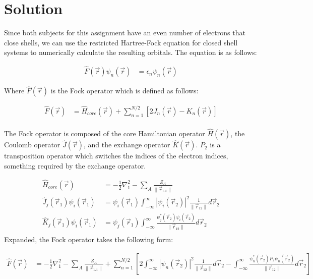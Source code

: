 \documentclass[10pt, oneside, letterpaper]{article}
\begin{document}
\section{Solution}

Since both subjects for this assignment have an even number of electrons that close shells, we can use the restricted Hartree-Fock equation for closed shell systems to numerically calculate the resulting orbitals. The equation is as follows:

\begin{align*}
  \hat{F}(\vec{r})\psi_n(\vec{r}) &= \epsilon_n\psi_n(\vec{r})
\end{align*}

Where $\hat{F}(\vec{r})$ is the Fock operator which is defined as follows:

\begin{align*}
  \hat{F}(\vec{r}) &= \hat{H}_{core}(\vec{r}) + \sum_{n=1}^{N/2}\left[2J_n(\vec{r}) - K_n(\vec{r})\right]\\
\end{align*}

The Fock operator is composed of the core Hamiltonian operator $\hat{H}(\vec{r})$, the Coulomb operator $\hat{J}(\vec{r})$, and the exchange operator $\hat{K}(\vec{r})$. $P_2$ is a transposition operator which switches the indices of the electron indices, something required by the exchange operator.

\begin{align*}
  \hat{H}_{core}(\vec{r}) &= -\frac{1}{2}\nabla_1^2 - \sum_A\frac{Z_A}{\|\vec{r}_{1 A}\|}\\
  \hat{J}_j(\vec{r}_1)\psi_i(\vec{r}_1) &= \psi_i(\vec{r}_1)\int_{-\infty}^{\infty}\left|\psi_i(\vec{r}_2)\right|^2\frac{1}{\|\vec{r}_{12}\|}d\vec{r}_2 \\
  \hat{K}_j(\vec{r}_1)\psi_i(\vec{r}_1) &= \psi_j(\vec{r}_1)\int_{-\infty}^{\infty}\frac{\psi_j^\ast(\vec{r}_2)\psi_i(\vec{r}_2)}{\|\vec{r}_{12}\|}d\vec{r}_2 \\
\end{align*}
Expanded, the Fock operator takes the following form:

\begin{align*}
  \hat{F}(\vec{r}) &= -\frac{1}{2}\nabla_1^2 - \sum_A\frac{Z_A}{\|\vec{r}_{1 A}\|} + \sum_{n=1}^{N/2}\left[2\int_{-\infty}^{\infty}\left|\psi_n(\vec{r}_2)\right|^2\frac{1}{\|\vec{r}_{12}\|}d\vec{r}_2 - \int_{-\infty}^{\infty}\frac{\psi_n^\ast(\vec{r}_2)P_2\psi_n(\vec{r}_2)}{\|\vec{r}_{12}\|}d\vec{r}_2\right]
\end{align*}
\end{document}
